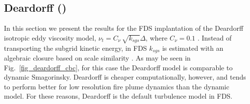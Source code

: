 \documentclass[11pt]{book}
\begin{document}
\clearpage

\subsection{Deardorff (\texorpdfstring{}{deardorff})}
\label{Deardorff_model}

In this section we present the results for the FDS implantation of the Deardorff isotropic eddy viscosity model, $\nu_t = C_\nu \,\sqrt{k_{sgs}} \Delta$, where $C_\nu = 0.1$ \cite{Pope:2000,Deardorff:1980}.  Instead of transporting the subgrid kinetic energy, in FDS $k_{sgs}$ is estimated with an algebraic closure based on scale similarity \cite{Bardina:1980}.  As may be seen in Fig.~\ref{fig_deardorff_cbc}, for this case the Deardorff model is comparable to dynamic Smagorinsky.  Deardorff is cheaper computationally, however, and tends to perform better for low resolution fire plume dynamics than the dynamic model. For these reasons, Deardorff is the default turbulence model in FDS.
\end{document}
